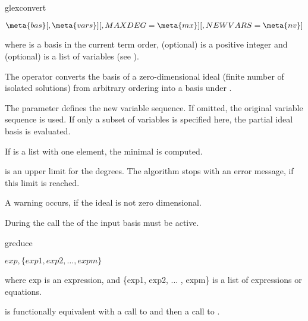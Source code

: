\begin{Operator}{glexconvert}
\begin{Syntax}

\(\meta{bas}[,\meta{vars}][,MAXDEG=\meta{mx}]
[,NEWVARS=\meta{nv}]\)

\end{Syntax}
where  is a  basis
in the current term order,   (optional) is a positive
integer and  (optional) is a list of variables 
(see ).


The operator  converts the basis 
of a zero-dimensional ideal (finite number
of isolated solutions) from arbitrary ordering into a basis under 
. 


The parameter  defines the new variable sequence. 
If omitted, the
original variable sequence is used. If only a subset of variables is
specified here, the partial ideal basis is evaluated. 

If  is a list with one element, the minimal
 is computed.

 is an upper limit for the degrees. The algorithm stops with
an error message, if this limit is reached.

A warning occurs, if the ideal is not zero dimensional.
\begin{Comments}
During the call the  of the input basis must
be active.
\end{Comments}
\end{Operator}


\begin{Operator}{greduce}
\begin{Syntax}

\(exp, \{exp1, exp2, \ldots , expm\}\)

\end{Syntax}

where exp is an expression, and \{exp1, exp2, ... , expm\} is
a list of expressions or equations.


 is functionally equivalent with a call to
 and then a call to .
\end{Operator}



